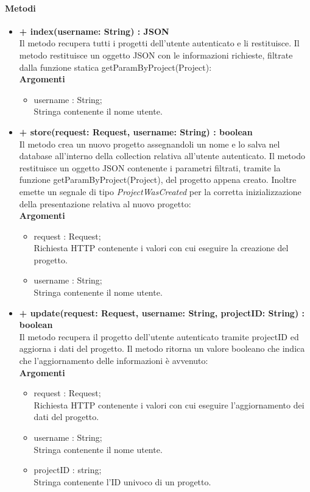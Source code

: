 	\paragraph{Metodi}
		\begin{itemize}
			\item \textbf{+ index(username: String) : JSON}\\
			Il metodo recupera tutti i progetti dell'utente autenticato e li restituisce. Il metodo restituisce un oggetto \gls{JSON} con le informazioni richieste, filtrate dalla funzione statica getParamByProject(Project):\\
			\textbf{Argomenti}
			\begin{itemize}
				\item username : String;\\
				Stringa contenente il nome utente.
			\end{itemize}
			
			\item \textbf{+ store(request: Request, username: String) : boolean}\\
			Il metodo crea un nuovo progetto assegnandoli un nome e lo salva nel \gls{database} all'interno della collection relativa all'utente autenticato. Il metodo restituisce un oggetto \gls{JSON} contenente i parametri filtrati, tramite la funzione getParamByProject(Project), del progetto appena creato. Inoltre emette un segnale di tipo \textit{ProjectWasCreated} per la corretta inizializzazione della presentazione relativa al nuovo progetto:\\
			\textbf{Argomenti}
			\begin{itemize}
				\item request : Request;\\
			 	Richiesta HTTP contenente i valori con cui eseguire la creazione del progetto.
			 	\item username : String;\\
			 	Stringa contenente il nome utente.
			\end{itemize}
			
			\item \textbf{+ update(request: Request, username: String, projectID: String) : boolean}\\
			Il metodo recupera il progetto dell'utente autenticato tramite projectID ed aggiorna i dati del progetto. Il metodo ritorna un valore booleano che indica che l'aggiornamento delle informazioni è avvenuto:\\
			\textbf{Argomenti}
			\begin{itemize}
				\item request : Request;\\
				Richiesta HTTP contenente i valori con cui eseguire l'aggiornamento dei dati del progetto.
				\item username : String;\\
				Stringa contenente il nome utente.
				\item projectID : string; \\
				Stringa contenente l'ID univoco di un progetto.
			\end{itemize}
			

\end{itemize}
